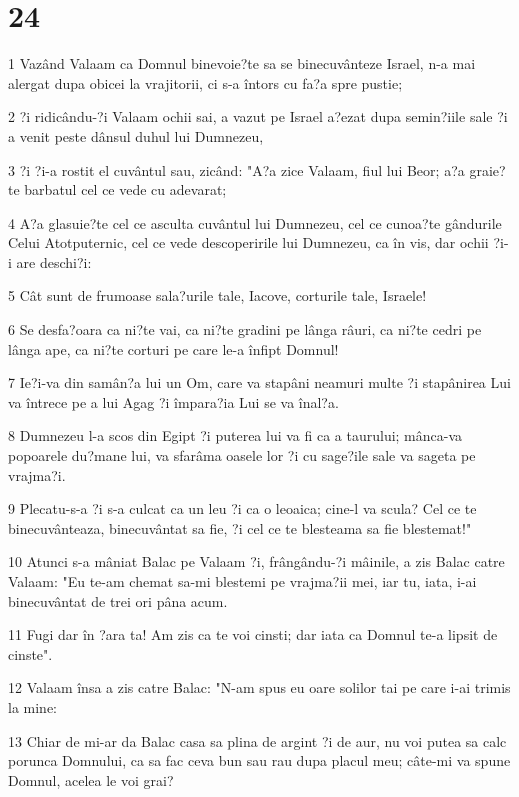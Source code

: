 \chapter{24}

\par 1 Vazând Valaam ca Domnul binevoie?te sa se binecuvânteze Israel, n-a mai alergat dupa obicei la vrajitorii, ci s-a întors cu fa?a spre pustie;
\par 2 ?i ridicându-?i Valaam ochii sai, a vazut pe Israel a?ezat dupa semin?iile sale ?i a venit peste dânsul duhul lui Dumnezeu,
\par 3 ?i ?i-a rostit el cuvântul sau, zicând: "A?a zice Valaam, fiul lui Beor; a?a graie?te barbatul cel ce vede cu adevarat;
\par 4 A?a glasuie?te cel ce asculta cuvântul lui Dumnezeu, cel ce cunoa?te gândurile Celui Atotputernic, cel ce vede descoperirile lui Dumnezeu, ca în vis, dar ochii ?i-i are deschi?i:
\par 5 Cât sunt de frumoase sala?urile tale, Iacove, corturile tale, Israele!
\par 6 Se desfa?oara ca ni?te vai, ca ni?te gradini pe lânga râuri, ca ni?te cedri pe lânga ape, ca ni?te corturi pe care le-a înfipt Domnul!
\par 7 Ie?i-va din samân?a lui un Om, care va stapâni neamuri multe ?i stapânirea Lui va întrece pe a lui Agag ?i împara?ia Lui se va înal?a.
\par 8 Dumnezeu l-a scos din Egipt ?i puterea lui va fi ca a taurului; mânca-va popoarele du?mane lui, va sfarâma oasele lor ?i cu sage?ile sale va sageta pe vrajma?i.
\par 9 Plecatu-s-a ?i s-a culcat ca un leu ?i ca o leoaica; cine-l va scula? Cel ce te binecuvânteaza, binecuvântat sa fie, ?i cel ce te blesteama sa fie blestemat!"
\par 10 Atunci s-a mâniat Balac pe Valaam ?i, frângându-?i mâinile, a zis Balac catre Valaam: "Eu te-am chemat sa-mi blestemi pe vrajma?ii mei, iar tu, iata, i-ai binecuvântat de trei ori pâna acum.
\par 11 Fugi dar în ?ara ta! Am zis ca te voi cinsti; dar iata ca Domnul te-a lipsit de cinste".
\par 12 Valaam însa a zis catre Balac: "N-am spus eu oare solilor tai pe care i-ai trimis la mine:
\par 13 Chiar de mi-ar da Balac casa sa plina de argint ?i de aur, nu voi putea sa calc porunca Domnului, ca sa fac ceva bun sau rau dupa placul meu; câte-mi va spune Domnul, acelea le voi grai?
